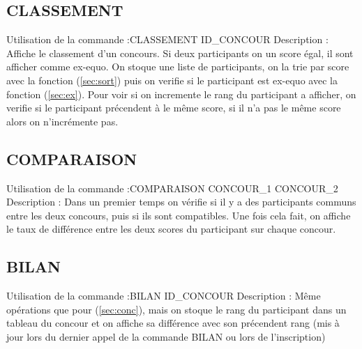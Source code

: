 \documentclass{article}
\newcommand{\commande}[3]{
	\subsection{#1}
	Utilisation de la commande :\newline #1 #2\newline
	Description :\newline#3
}
\begin{document}
\label{sec:conc}
\commande{CLASSEMENT}{ID\_CONCOUR}{
	Affiche le classement d'un concours. Si deux participants on un score égal, il sont afficher comme ex-equo. On stoque une liste de participants, on la trie par score avec la fonction (\ref{sec:sort}) puis on verifie si le participant est ex-equo avec la fonction (\ref{sec:ex}). Pour voir si on incremente le rang du participant a afficher, on verifie si le participant précendent à le même score, si il n'a pas le même score alors on n'incrémente pas.
}

\commande{COMPARAISON}{CONCOUR\_1 CONCOUR\_2}{
	Dans un premier temps on vérifie si il y a des participants communs entre les deux concours, puis si ils sont compatibles. Une fois cela fait, on affiche le taux de différence entre les deux scores du participant sur chaque concour.
}

\commande{BILAN}{ID\_CONCOUR}{
	Même opérations que pour (\ref{sec:conc}), mais on stoque le rang du participant dans un tableau du concour et on affiche sa différence avec son précendent rang (mis à jour lors du dernier appel de la commande BILAN ou lors de l'inscription)
}
\end{document}
